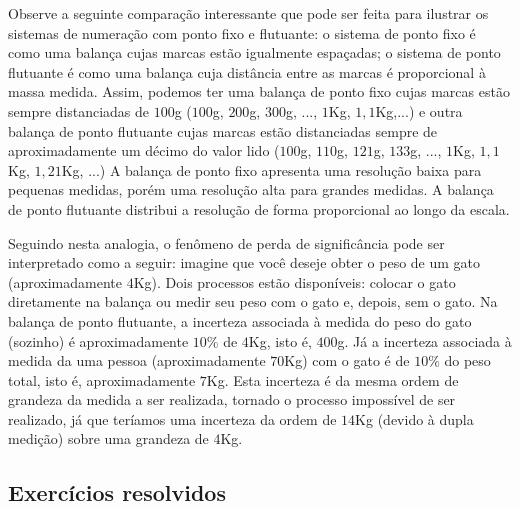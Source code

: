 \begin{ex} Observe a seguinte comparação interessante que pode ser feita para ilustrar os sistemas de numeração com ponto fixo e flutuante: o sistema de ponto fixo é como uma balança cujas marcas estão igualmente espaçadas; o sistema de ponto flutuante é como uma balança cuja distância entre as marcas é proporcional à massa medida. Assim, podemos ter uma balança de ponto fixo cujas marcas estão sempre distanciadas de $100$g ($100$g, $200$g, $300$g, ..., $1$Kg, $1,1$Kg,...) e outra balança de ponto flutuante cujas marcas estão distanciadas sempre de aproximadamente um décimo do valor lido ($100$g, $110$g, $121$g, $133$g, ..., $1$Kg, $1,1$Kg, $1,21$Kg, ...) A balança de ponto fixo apresenta uma resolução baixa para pequenas medidas, porém uma resolução alta para grandes medidas. A balança de ponto flutuante distribui a resolução de forma proporcional ao longo da escala.    

Seguindo nesta analogia, o fenômeno de perda de significância pode ser interpretado como a seguir: imagine que você deseje obter o peso de um gato (aproximadamente $4$Kg). Dois processos estão disponíveis: colocar o gato diretamente na balança ou medir seu peso com o gato e, depois, sem o gato. Na balança de ponto flutuante, a incerteza associada à medida do peso do gato (sozinho) é aproximadamente $10\%$ de $4$Kg, isto é, $400$g. Já a incerteza associada à medida da uma pessoa (aproximadamente $70$Kg) com o gato é de $10\%$ do peso total, isto é, aproximadamente $7$Kg. Esta incerteza é da mesma ordem de grandeza da medida a ser realizada, tornado o processo impossível de ser realizado, já que teríamos uma incerteza da ordem de $14$Kg (devido à dupla medição) sobre uma grandeza de $4$Kg.    
\end{ex}

\subsection*{Exercícios resolvidos}

